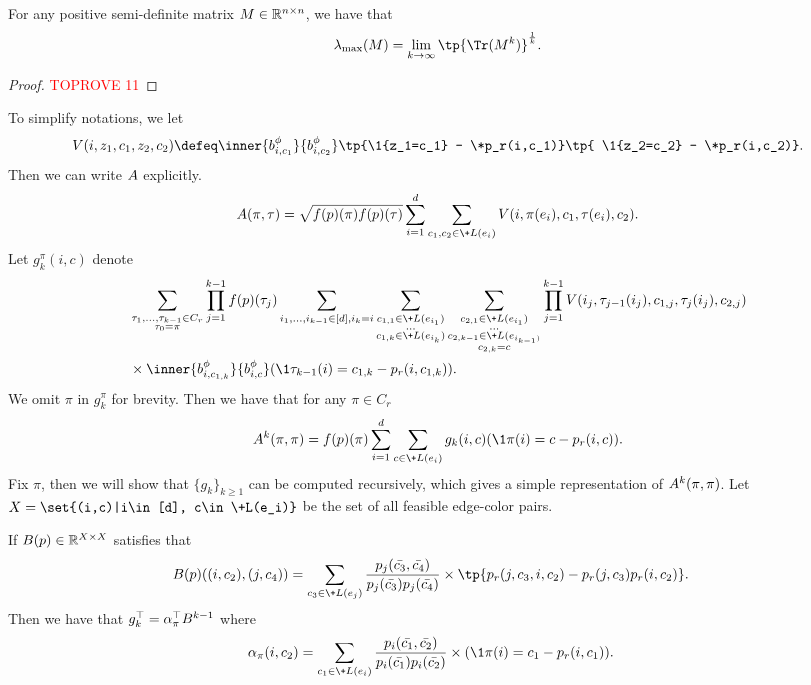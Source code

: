 \documentclass[a4paper,11pt]{article}
\begin{document}
\begin{lemma}\label{lem:clac_lammax}
    For any positive semi-definite matrix $\*M \in \mathbb R^{n\times n}$, we have that
    \[
        \lambda_{\max} (\*M) = \lim_{k\to \infty}
        \tp{\Tr(\*M^k)}^{\frac 1k}.
    \]
\end{lemma}
\begin{proof}\textcolor{red}{TOPROVE 11}\end{proof}
To simplify notations, we let
\[
V(i,z_1,c_1,z_2,c_2) \defeq \inner{\*b_{i,c_1}^\phi}{\*b_{i,c_2}^\phi}
    \tp{\1{z_1=c_1} - \*p_r(i,c_1)}\tp{
    \1{z_2=c_2} - \*p_r(i,c_2)}.
\]
Then we can write $\*A$ explicitly.
\begin{equation}\label{eq:equation_A}
    \*A(\pi,\tau) = \sqrt{f(\*p)(\pi)f(\*p)(\tau)} \sum_{i=1}^d \sum_{c_1,c_2\in \+L(e_i)} V(i,\pi(e_i),c_1,\tau(e_i),c_2).
\end{equation}
Let $g_k^\pi(i,c)$ denote
\begin{align*}
    &\sum_{\substack{\tau_1,...,\tau_{k-1}\in C_r\\ \tau_0=\pi}} \prod_{j=1}^{k-1}f(\*p)(\tau_j)
    \sum_{i_1,...,i_{k-1}\in[d],i_k=i}
    \sum_{\substack{c_{1,1}\in \+L(e_{i_1})\\...\\c_{1,k}\in \+L(e_{i_k})}}
    \sum_{\substack{c_{2,1}\in \+L(e_{i_1})\\...\\c_{2,k-1}\in \+L(e_{i_{k-1})}\\c_{2,k}=c}}
    \prod_{j=1}^{k-1} V(i_j,\tau_{j-1}(i_j),c_{1,j},\tau_j(i_j),c_{2,j})
    \\&\times \inner{\*b_{i,c_{1,k}}^\phi}{\*b_{i,c}^\phi}(\1{\tau_{k-1}(i) = c_{1,k}} -  \*p_r(i,c_{1,k})).
\end{align*}
We omit $\pi$ in $g_k^\pi$ for brevity.
Then we have that for any $\pi \in C_r$
\begin{align}\label{eq:trace_of_A}
    \*A^k(\pi,\pi) = f(\*p)(\pi)\sum_{i=1}^d
    \sum_{c\in \+L(e_i)} g_k(i,c) (\1{\pi(i) = c} -  \*p_r(i,c)).
\end{align}
Fix $\pi$, then we will show that $\{g_k\}_{k\geq 1}$ can be computed recursively, which gives a simple representation of $\*A^k(\pi,\pi)$. Let $X=\set{(i,c)|i\in [d], c\in \+L(e_i)}$ be the set of all feasible edge-color pairs. 
\begin{lemma}\label{lem:recursion_for_g}
    If $\*B(\*p)\in \mathbb R^{X\times X}$ satisfies that
    \begin{align*}
        \*B(\*p)((i,c_2),(j,c_4)) &= 
        \sum_{c_3 \in \+L(e_j)}
        \frac{\*p_j(\bar{c_3},\bar{c_4})}{\*p_j(\bar{c_3})\*p_j(\bar{c_4})}\times \tp{\*p_r(j,c_3,i,c_2) - \*p_r(j,c_3)\*p_r(i,c_2)}.
    \end{align*}
    Then we have that $g_k^\top = \alpha^\top_\pi \*B^{k-1}$ where
    \begin{align*}
        \alpha_\pi(i,c_2) &= \sum_{c_1 \in \+L(e_i)}
         \frac{\*p_i(\bar{c_1},\bar{c_2})}{\*p_i(\bar{c_1})\*p_i(\bar{c_2})}
        \times (\1{\pi(i) = c_1} - \*p_r(i,c_1)).
    \end{align*}
\end{lemma}
\end{document}
